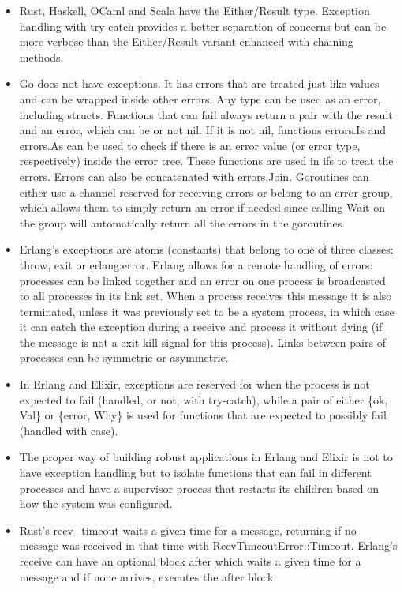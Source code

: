 \documentclass[a4paper,11pt]{article}
\theoremstyle{plain}
\theoremstyle{nonumberplain}
\begin{document}
\begin{itemize}
  \item Rust, Haskell, OCaml and Scala have the Either/Result type. Exception handling with try-catch provides a better separation of concerns but can be more verbose than the Either/Result variant enhanced with chaining methods.
  \item Go does not have exceptions. It has errors that are treated just like values and can be wrapped inside other errors. Any type can be used as an error, including structs. Functions that can fail always return a pair with the result and an error, which can be or not nil. If it is not nil, functions errors.Is and errors.As can be used to check if there is an error value (or error type, respectively) inside the error tree. These functions are used in ifs to treat the errors. Errors can also be concatenated with errors.Join. Goroutines can either use a channel reserved for receiving errors or belong to an error group, which allows them to simply return an error if needed since calling Wait on the group will automatically return all the errors in the goroutines.
  \item Erlang's exceptions are atoms (constants) that belong to one of three classes: throw, exit or erlang:error. Erlang allows for a remote handling of errors: processes can be linked together and an error on one process is broadcasted to all processes in its link set. When a process receives this message it is also terminated, unless it was previously set to be a system process, in which case it can catch the exception during a receive and process it without dying (if the message is not a exit kill signal for this process). Links between pairs of processes can be symmetric or asymmetric.
  \item In Erlang and Elixir, exceptions are reserved for when the process is not expected to fail (handled, or not, with try-catch), while a pair of either \{ok, Val\} or \{error, Why\} is used for functions that are expected to possibly fail (handled with case).
  \item The proper way of building robust applications in Erlang and Elixir is not to have exception handling but to isolate functions that can fail in different processes and have a supervisor process that restarts its children based on how the system was configured.
  \item Rust's recv\_timeout waits a given time for a message, returning if no message was received in that time with RecvTimeoutError::Timeout. Erlang's receive can have an optional block after which waits a given time for a message and if none arrives, executes the after block.

\end{itemize}
\end{document}
